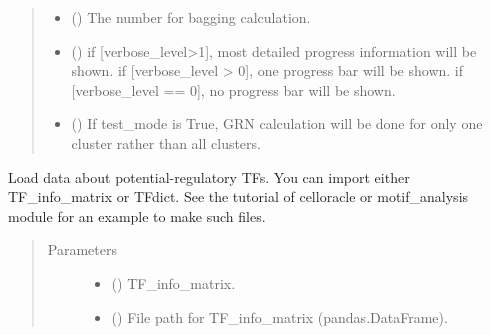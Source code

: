 \documentclass[letterpaper,10pt,english]{sphinxmanual}
\begin{document}
\begin{fulllineitems}
\begin{fulllineitems}
\begin{quote}
\begin{description}
\begin{itemize}
\item {} 
 () \textendash{} The number for bagging calculation.

\item {} 
 () \textendash{} if {[}verbose\_level\textgreater{}1{]}, most detailed progress information will be shown.
if {[}verbose\_level \textgreater{} 0{]}, one progress bar will be shown.
if {[}verbose\_level == 0{]}, no progress bar will be shown.

\item {} 
 () \textendash{} If test\_mode is True, GRN calculation will be done for only one cluster rather than all clusters.

\end{itemize}

\end{description}\end{quote}

\end{fulllineitems}


\begin{fulllineitems}
\label{\detokenize{modules/celloracle:celloracle.Oracle.import_TF_data}}
Load data about potential-regulatory TFs.
You can import either TF\_info\_matrix or TFdict.
See the tutorial of celloracle or motif\_analysis module for an example to make such files.
\begin{quote}\begin{description}
\item[{Parameters}] \leavevmode\begin{itemize}
\item {} 
 () \textendash{} TF\_info\_matrix.

\item {} 
 () \textendash{} File path for TF\_info\_matrix (pandas.DataFrame).


\end{itemize}
\end{description}
\end{quote}
\end{fulllineitems}
\end{fulllineitems}
\end{document}
